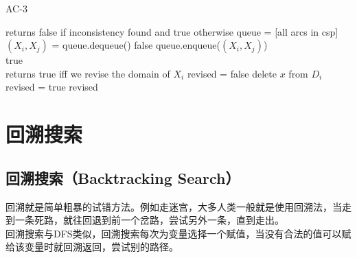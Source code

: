 \begin{algorithm}[H]
    \caption{AC-3}
    \begin{algorithmic}[1]
         returns false if inconsistency found and true otherwise
        \State queue = [all arcs in csp]
        \\
        \State $ (X_i, X_j) $ = queue.dequeue()
        \State \Return false
        \EndIf
        \State queue.enqueue($ (X_i, X_j) $)
        \EndFor
        \EndIf
        \EndWhile
        \\
        \State \Return true
        \EndProcedure
        \\
         returns true iff we revise the domain of $ X_i $
        \State revised = false
        \State delete $ x $ from $ D_i $
        \State revised = true
        \EndIf
        \EndFor
        \State \Return revised
        \EndProcedure
    \end{algorithmic}
\end{algorithm}

\newpage

\section{回溯搜索}

\subsection{回溯搜索（Backtracking Search）}

回溯就是简单粗暴的试错方法。例如走迷宫，大多人类一般就是使用回溯法，当走到一条死路，就往回退到前一个岔路，尝试另外一条，直到走出。\\

回溯搜索与DFS类似，回溯搜索每次为变量选择一个赋值，当没有合法的值可以赋给该变量时就回溯返回，尝试别的路径。\\

